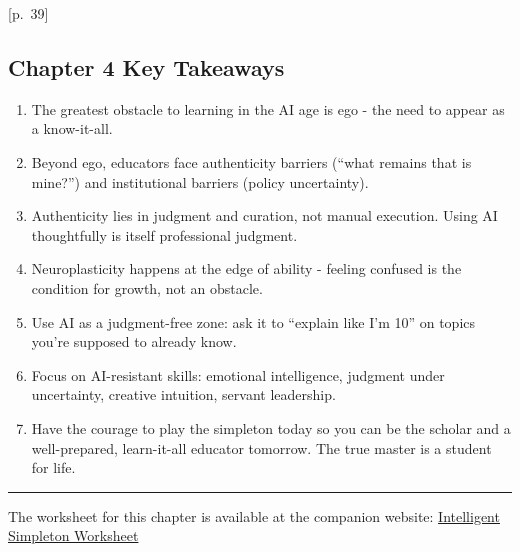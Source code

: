 \documentclass[
  letterpaper,
  DIV=11,
  numbers=noendperiod]{scrreprt}
\providecommand{\tightlist}{%
  \setlength{\itemsep}{0pt}\setlength{\parskip}{0pt}}
\begin{document}
{[}p.~39{]}

\subsection{Chapter 4 Key Takeaways}\label{chapter-4-key-takeaways}

\begin{enumerate}
\def\labelenumi{\arabic{enumi}.}
\tightlist
\item
  The greatest obstacle to learning in the AI age is ego - the need to
  appear as a know-it-all.
\item
  Beyond ego, educators face authenticity barriers (``what remains that
  is mine?'') and institutional barriers (policy uncertainty).
\item
  Authenticity lies in judgment and curation, not manual execution.
  Using AI thoughtfully is itself professional judgment.
\item
  Neuroplasticity happens at the edge of ability - feeling confused is
  the condition for growth, not an obstacle.
\item
  Use AI as a judgment-free zone: ask it to ``explain like I'm 10'' on
  topics you're supposed to already know.
\item
  Focus on AI-resistant skills: emotional intelligence, judgment under
  uncertainty, creative intuition, servant leadership.
\item
  Have the courage to play the simpleton today so you can be the scholar
  and a well-prepared, learn-it-all educator tomorrow. The true master
  is a student for life.
\end{enumerate}

\begin{center}\rule{0.5\linewidth}{0.5pt}\end{center}

\begin{tcolorbox}[enhanced jigsaw, arc=.35mm, bottomrule=.15mm, bottomtitle=1mm, breakable, colback=white, colbacktitle=quarto-callout-note-color!10!white, colframe=quarto-callout-note-color-frame, coltitle=black, left=2mm, leftrule=.75mm, opacityback=0, opacitybacktitle=0.6, rightrule=.15mm, title=\textcolor{quarto-callout-note-color}{\faInfo}\hspace{0.5em}{Companion Worksheet}, titlerule=0mm, toprule=.15mm, toptitle=1mm]

The worksheet for this chapter is available at the companion website:
\href{https://dataii.com/ai/guidebook/\#:~:text=Intelligent\%20Simpleton\%20Worksheet}{Intelligent
Simpleton Worksheet}

\end{tcolorbox}
\end{document}
